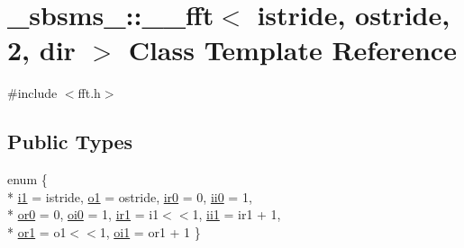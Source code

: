 \hypertarget{class__sbsms___1_1____fft_3_01istride_00_01ostride_00_012_00_01dir_01_4}{}\section{\+\_\+sbsms\+\_\+\+:\+:\+\_\+\+\_\+fft$<$ istride, ostride, 2, dir $>$ Class Template Reference}
\label{class__sbsms___1_1____fft_3_01istride_00_01ostride_00_012_00_01dir_01_4}


{\ttfamily \#include $<$fft.\+h$>$}

\subsection*{Public Types}
\begin{DoxyCompactItemize}
\item 
enum \{ \\*
\hyperlink{class__sbsms___1_1____fft_3_01istride_00_01ostride_00_012_00_01dir_01_4_a1453f4ffe340f0db15bb5673b10bd807a64557aab17dfd3ebe66b536aae247e46}{i1} = istride, 
\hyperlink{class__sbsms___1_1____fft_3_01istride_00_01ostride_00_012_00_01dir_01_4_a1453f4ffe340f0db15bb5673b10bd807ab4f06a1e396690cf2824c4b40d99fb2c}{o1} = ostride, 
\hyperlink{class__sbsms___1_1____fft_3_01istride_00_01ostride_00_012_00_01dir_01_4_a1453f4ffe340f0db15bb5673b10bd807ad7ecbfd9980de7b4e6c0f40c8b612595}{ir0} = 0, 
\hyperlink{class__sbsms___1_1____fft_3_01istride_00_01ostride_00_012_00_01dir_01_4_a1453f4ffe340f0db15bb5673b10bd807a3f6e69187c31c9b0f3b95b0edda94af8}{ii0} = 1, 
\\*
\hyperlink{class__sbsms___1_1____fft_3_01istride_00_01ostride_00_012_00_01dir_01_4_a1453f4ffe340f0db15bb5673b10bd807a92558998e48a4321371874f76e1dc7ba}{or0} = 0, 
\hyperlink{class__sbsms___1_1____fft_3_01istride_00_01ostride_00_012_00_01dir_01_4_a1453f4ffe340f0db15bb5673b10bd807a0af41410b7d4e43157ec19167b28200a}{oi0} = 1, 
\hyperlink{class__sbsms___1_1____fft_3_01istride_00_01ostride_00_012_00_01dir_01_4_a1453f4ffe340f0db15bb5673b10bd807a6c8faf0e6cd57829d4ee70e68fa1fe17}{ir1} = i1$<$$<$1, 
\hyperlink{class__sbsms___1_1____fft_3_01istride_00_01ostride_00_012_00_01dir_01_4_a1453f4ffe340f0db15bb5673b10bd807a2e7994f76eaba8370a3f490273e69bcd}{ii1} = ir1 + 1, 
\\*
\hyperlink{class__sbsms___1_1____fft_3_01istride_00_01ostride_00_012_00_01dir_01_4_a1453f4ffe340f0db15bb5673b10bd807a49becfbc669fa0bd3fd8d59134bbde5e}{or1} = o1$<$$<$1, 
\hyperlink{class__sbsms___1_1____fft_3_01istride_00_01ostride_00_012_00_01dir_01_4_a1453f4ffe340f0db15bb5673b10bd807ab5459afa6036a955c299a6f86f2c84eb}{oi1} = or1 + 1
 \}
\end{DoxyCompactItemize}
